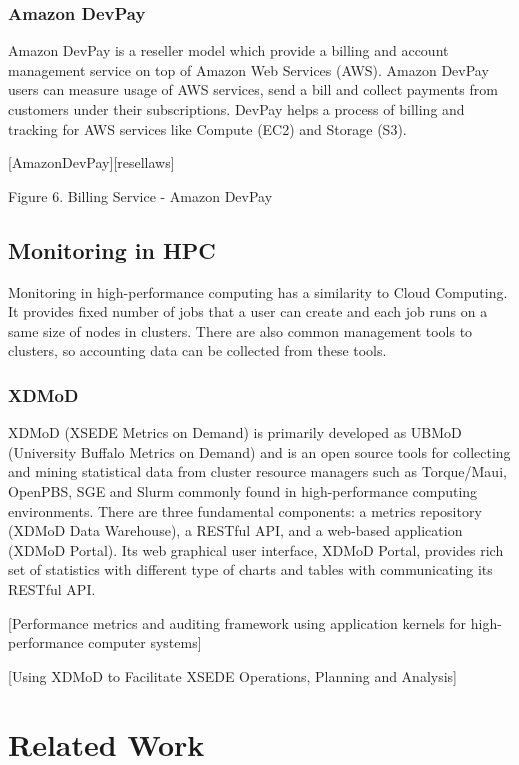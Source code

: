 \documentclass{sig-alternate}
\begin{document}
\subsubsection{Amazon DevPay}

Amazon DevPay is a reseller model which provide a billing and account management service on top of Amazon Web Services (AWS). Amazon DevPay users can measure usage of AWS services, send a bill and collect payments from customers under their subscriptions. DevPay helps a process of billing and tracking for AWS services like Compute (EC2) and Storage (S3).

[AmazonDevPay][resellaws]

Figure 6. Billing Service - Amazon DevPay

\subsection{Monitoring in HPC}

Monitoring in high-performance computing has a similarity to Cloud Computing. It provides fixed number of jobs that a user can create and each job runs on a same size of nodes in clusters. There are also common management tools to clusters, so accounting data can be collected from these tools.

\subsubsection{XDMoD}

XDMoD (XSEDE Metrics on Demand) is primarily developed as UBMoD (University Buffalo Metrics on Demand) and is an open source tools for collecting and mining statistical data from cluster resource managers such as Torque/Maui, OpenPBS, SGE and Slurm commonly found in high-performance computing environments. There are three fundamental components: a metrics repository (XDMoD Data Warehouse), a RESTful API, and a web-based application (XDMoD Portal). Its web graphical user interface, XDMoD Portal, provides rich set of statistics with different type of charts and tables with communicating its RESTful API.

[Performance metrics and auditing framework using application kernels for high-performance computer systems]

[Using XDMoD to Facilitate XSEDE Operations, Planning and Analysis]

\section{Related Work} \label{S:related}
\end{document}
